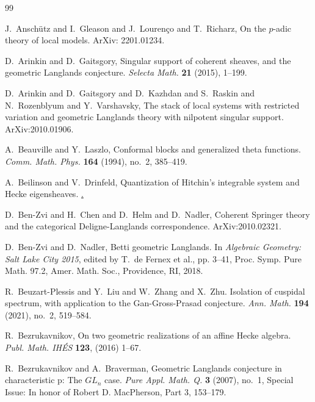 
\clearpage
{}
{}

\begin{thebibliography}{99}

J.~Ansch\"utz and I.~Gleason and J.~Louren\c{c}o and T.~Richarz, On the $p$-adic theory of local models. ArXiv: 2201.01234.

D.~Arinkin and D.~Gaitsgory, Singular support of coherent sheaves, and the geometric Langlands conjecture. \emph{Selecta Math.} \textbf{21} (2015), 1--199.

D.~Arinkin and D.~Gaitsgory and D.~Kazhdan and S.~Raskin and N.~Rozenblyum and Y.~Varshavsky, The stack of local systems with restricted variation and geometric Langlands theory with nilpotent singular support. ArXiv:2010.01906.

A.~Beauville and Y.~Laszlo, Conformal blocks and generalized theta functions. \emph{Comm. Math. Phys.} \textbf{164} (1994), no.~2, 385--419.

A.~Beilinson and V.~Drinfeld, Quantization of Hitchin's integrable system and Hecke eigensheaves. \href{www.math.uchicago.edu/~mitya/langlands}.

D.~Ben-Zvi and H.~Chen and D.~Helm and D.~Nadler, Coherent Springer theory and the categorical Deligne-Langlands correspondence. ArXiv:2010.02321.

D.~Ben-Zvi and D.~Nadler, Betti geometric Langlands. In \emph{Algebraic Geometry: Salt Lake City 2015}, edited by T.~de Fernex et al., pp. 3--41, Proc. Symp. Pure Math. 97.2, Amer. Math. Soc., Providence, RI, 2018.

 R.~Beuzart-Plessis and Y.~Liu and W.~Zhang and X.~Zhu. Isolation of cuspidal spectrum, with application to the Gan-Gross-Prasad conjecture. \emph{Ann. Math.} \textbf{194} (2021), no.~2, 519--584.

R.~Bezrukavnikov, On two geometric realizations of an affine Hecke algebra. \emph{Publ. Math. IH\'ES} \textbf{123}, (2016) 1--67.

R.~Bezrukavnikov and A.~Braverman, Geometric Langlands
conjecture in characteristic p: The $GL_n$ case. \emph{Pure Appl. Math. Q.} \textbf{3} (2007), no.~1, Special Issue: In honor of Robert D. MacPherson, Part 3, 153--179.


\end{thebibliography}
